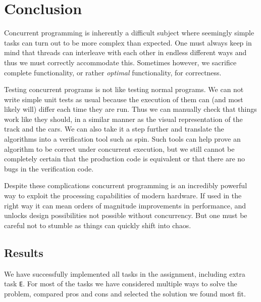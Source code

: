 \section*{Conclusion}

Concurrent programming is inherently a difficult subject where seemingly simple tasks can turn out to be more complex than expected. One must always keep in mind that threads can interleave with each other in endless different ways and thus we must correctly accommodate this. Sometimes however, we sacrifice complete functionality, or rather \emph{optimal} functionality, for correctness.

Testing concurrent programs is not like testing normal programs. We can not write simple unit tests as usual because the execution of them can (and most likely will) differ each time they are run. Thus we can manually check that things work like they should, in a similar manner as the visual representation of the track and the cars. We can also take it a step further and translate the algorithms into a verification tool such as spin. Such tools can help prove an algorithm to be correct under concurrent execution, but we still cannot be completely certain that the production code is equivalent or that there are no bugs in the verification code.

Despite these complications concurrent programming is an incredibly powerful way to exploit the processing capabilities of modern hardware. If used in the right way it can mean orders of magnitude improvements in performance, and unlocks design possibilities not possible without concurrency. But one must be careful not to stumble as things can quickly shift into chaos.

\subsection*{Results}
We have successfully implemented all tasks in the assignment, including extra task \texttt{E}. For most of the tasks we have considered multiple ways to solve the problem, compared pros and cons and selected the solution we found most fit.



